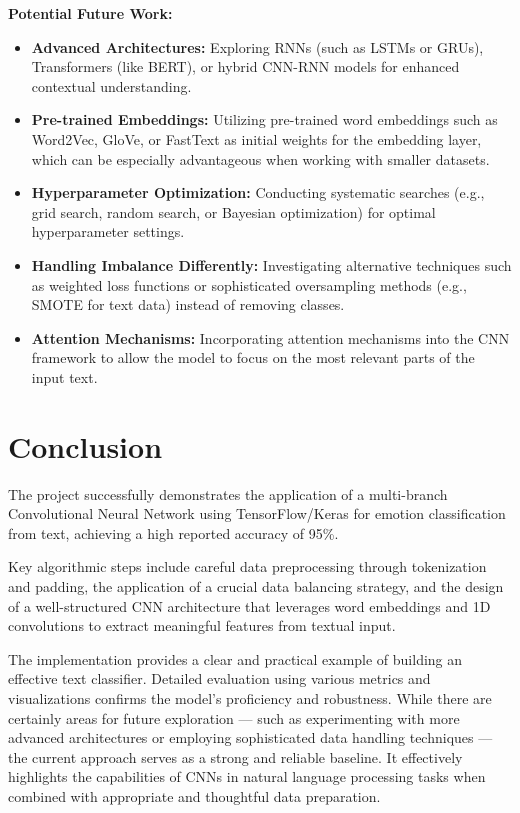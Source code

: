 \documentclass[twocolumn]{article}
\begin{document}
\vspace{0.5em}
\textbf{Potential Future Work:}
\begin{itemize}
    \item \textbf{Advanced Architectures:} Exploring RNNs (such as LSTMs or GRUs), Transformers (like BERT), or hybrid CNN-RNN models for enhanced contextual understanding.
    \item \textbf{Pre-trained Embeddings:} Utilizing pre-trained word embeddings such as Word2Vec, GloVe, or FastText as initial weights for the embedding layer, which can be especially advantageous when working with smaller datasets.
    \item \textbf{Hyperparameter Optimization:} Conducting systematic searches (e.g., grid search, random search, or Bayesian optimization) for optimal hyperparameter settings.
    \item \textbf{Handling Imbalance Differently:} Investigating alternative techniques such as weighted loss functions or sophisticated oversampling methods (e.g., SMOTE for text data) instead of removing classes.
    \item \textbf{Attention Mechanisms:} Incorporating attention mechanisms into the CNN framework to allow the model to focus on the most relevant parts of the input text.
\end{itemize}


\section{Conclusion}

\vspace{0.5em}
The project successfully demonstrates the application of a multi-branch Convolutional Neural Network using TensorFlow/Keras for emotion classification from text, achieving a high reported accuracy of 95\%. 

\vspace{0.5em}
Key algorithmic steps include careful data preprocessing through tokenization and padding, the application of a crucial data balancing strategy, and the design of a well-structured CNN architecture that leverages word embeddings and 1D convolutions to extract meaningful features from textual input.

\vspace{0.5em}
The implementation provides a clear and practical example of building an effective text classifier. Detailed evaluation using various metrics and visualizations confirms the model's proficiency and robustness. While there are certainly areas for future exploration — such as experimenting with more advanced architectures or employing sophisticated data handling techniques — the current approach serves as a strong and reliable baseline. It effectively highlights the capabilities of CNNs in natural language processing tasks when combined with appropriate and thoughtful data preparation.
\end{document}
